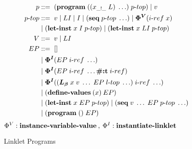 \documentclass[sigplan,screen,anonymous]{acmart}
\def\dash {\text{-}}
\begin{document}
\begin{figure}[h!]
  \begin{align*}
    p           &::=\; (\textbf{program}\; ((x_{\_!\_}\; L)\; \ldots)\; p\dash top)\; |\; v \\
    p\dash top  &::=\; v\; |\; LI\; |\; I\; |\; (\textbf{seq}\; p\dash top\; \ldots)\; |\; \bm{\Phi^V}(i\dash ref\; x) \\
    \;          &\;|\; (\textbf{let\dash inst}\; x\; I\;p\dash top)\; |\; (\textbf{let\dash inst}\; x\; LI\;p\dash top) \\
    V           &::=\; v\; |\; LI \\
    EP          &::=\; [] \\
    \;          &\;|\; \bm{\Phi^I}(EP\; i\dash ref\; \ldots) \\ %
    \;          &\;|\; \bm{\Phi^I}(EP\; i\dash ref\; \ldots \textbf{\#:t}\; i\dash ref) \\ %
    \;          &\;|\; \bm{\Phi^I}((\lb\; x\; v\; \ldots\; EP\; l\dash top\; \ldots)\; i\dash ref\; \ldots) \\
    \;          &\;|\; (\textbf{define\dash values}\:(x)\:EP) \\
    \;          &\;|\; (\textbf{let\dash inst}\; x\; EP\; p\dash top)\; |\; (\textbf{seq}\; v\; \ldots\; EP\; p\dash top\; \ldots) \\
    \;          &\;|\; (\textbf{program}\; ()\; EP) \\
  \end{align*}
  \hfill \footnotesize $\Phi^V : \textbf{instance\dash variable\dash value}\:,\: \Phi^I : \textbf{instantiate\dash linklet}$
\caption{Linklet Programs}
\label{fig:linklet-program}
\end{figure}

\newcommand{\redinput}[1]{EP\;\llbracket #1 \rrbracket, \rho, \sigma\;}
\newcommand{\redoutput}[3]{EP\;\llbracket #1 \rrbracket, #2, #3\;}
\def\where {\textbf{where}\;}
\def\rel {&\longrightarrow_{\beta p}\;}
\end{document}
